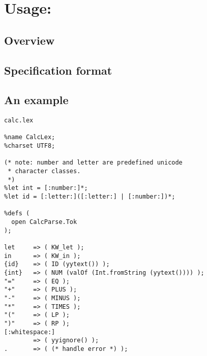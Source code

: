 \chapter[\ulex]{Usage: \ulex}

\section{Overview}

\section{Specification format}


\section{An example}

\begin{verbatim}
calc.lex

%name CalcLex;
%charset UTF8;

(* note: number and letter are predefined unicode 
 * character classes.
 *)
%let int = [:number:]*;
%let id = [:letter:]([:letter:] | [:number:])*;

%defs (
  open CalcParse.Tok
);

let     => ( KW_let );
in      => ( KW_in );
{id}    => ( ID (yytext()) );
{int}   => ( NUM (valOf (Int.fromString (yytext()))) );
"="     => ( EQ );
"+"     => ( PLUS );
"-"     => ( MINUS );
"*"     => ( TIMES );
"("     => ( LP );
")"     => ( RP );
[:whitespace:]
        => ( yyignore() );
.       => ( (* handle error *) );
\end{verbatim}
